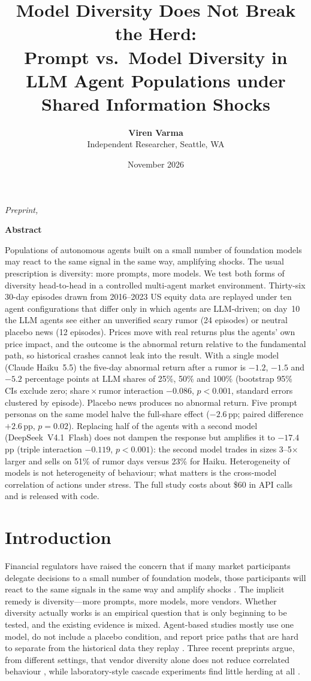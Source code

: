\documentclass[10pt]{article}
\title{Model Diversity Does Not Break the Herd:\\[2pt] Prompt vs.\ Model Diversity in LLM Agent Populations under Shared Information Shocks}
\author{\textbf{Viren Varma}\\ Independent Researcher, Seattle, WA}
\date{November 2026}
\makeatletter
\renewenvironment{abstract}{%
  \centerline{\bfseries\large Abstract}\vspace{0.5em}%
  \begin{list}{}{\leftmargin=0.4in\rightmargin=0.4in}\item\relax\small}{\end{list}}
\renewcommand{\maketitle}{%
  \begin{center}%
    {\LARGE\bfseries \@title\par}\vspace{1.2em}%
    {\normalsize \@author\par}\vspace{0.6em}%
    {\small\itshape Preprint, \@date\par}%
  \end{center}\vspace{0.8em}}
\makeatother
\begin{document}
\maketitle

\begin{abstract}
Populations of autonomous agents built on a small number of foundation models may react to the same signal in the same way, amplifying shocks. The usual prescription is diversity: more prompts, more models. We test both forms of diversity head-to-head in a controlled multi-agent market environment. Thirty-six 30-day episodes drawn from 2016--2023 US equity data are replayed under ten agent configurations that differ only in which agents are LLM-driven; on day~10 the LLM agents see either an unverified scary rumor (24 episodes) or neutral placebo news (12 episodes). Prices move with real returns plus the agents' own price impact, and the outcome is the abnormal return relative to the fundamental path, so historical crashes cannot leak into the result. With a single model (Claude Haiku~5.5) the five-day abnormal return after a rumor is $-1.2$, $-1.5$ and $-5.2$ percentage points at LLM shares of 25\%, 50\% and 100\% (bootstrap 95\% CIs exclude zero; share\,$\times$\,rumor interaction $-0.086$, $p<0.001$, standard errors clustered by episode). Placebo news produces no abnormal return. Five prompt personas on the same model halve the full-share effect ($-2.6$\,pp; paired difference $+2.6$\,pp, $p=0.02$). Replacing half of the agents with a second model (DeepSeek~V4.1~Flash) does not dampen the response but amplifies it to $-17.4$\,pp (triple interaction $-0.119$, $p<0.001$): the second model trades in sizes 3--5$\times$ larger and sells on 51\% of rumor days versus 23\% for Haiku. Heterogeneity of models is not heterogeneity of behaviour; what matters is the cross-model correlation of actions under stress. The full study costs about \$60 in API calls and is released with code.
\end{abstract}

\section{Introduction}

Financial regulators have raised the concern that if many market participants delegate decisions to a small number of foundation models, those participants will react to the same signals in the same way and amplify shocks \citep{boe2026}. The implicit remedy is diversity---more prompts, more models, more vendors. Whether diversity actually works is an empirical question that is only beginning to be tested, and the existing evidence is mixed. Agent-based studies mostly use one model, do not include a placebo condition, and report price paths that are hard to separate from the historical data they replay \citep{sok2026,twinmarket2025}. Three recent preprints argue, from different settings, that vendor diversity alone does not reduce correlated behaviour \citep{ross2026,kohli2026,saxena2026}, while laboratory-style cascade experiments find little herding at all \citep{hansen2025,zhang2026}.
\end{document}
